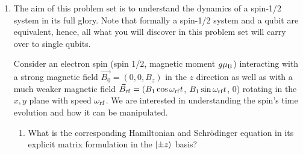 \documentclass{../lab}
\begin{document}
\begin{enumerate}



\item The aim of this problem set is to understand the dynamics of a spin-1/2 system in its full glory. Note that formally a spin-1/2 system and a qubit are equivalent, hence, all what you will discover in this problem set will carry over to single qubits.  

		Consider an electron spin (spin 1/2, magnetic moment $g\mu_{\rm B}$) interacting with a strong magnetic field $\vec{B_0}=(0,0,B_z)$ in 
		the $z$ direction as well as with a much weaker magnetic field 
		$\vec{B}_{\rm rf}=(B_1 \cos \omega_{\rm rf} t$, $B_1 \sin \omega_{\rm rf} t$, 0) 
		rotating in the $x,y$ plane with speed $\omega_{\rm rf}$. 
		We are interested in understanding the spin's time evolution and how it can 
		be manipulated.  
	\begin{enumerate}
		\item What is the corresponding Hamiltonian and Schr\"odinger equation in its explicit matrix formulation in the $\ket{\pm z}$ basis? 
	
		


\end{enumerate}
\end{enumerate}
\end{document}
